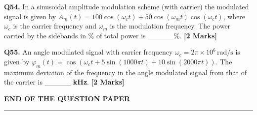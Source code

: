 \documentclass[11pt]{article}
\newcommand{\questionb}[2]{
    \noindent\textbf{Q#2.} #1 \hfill \textbf{[2 Marks]}
}
\begin{document}
\questionb{In a sinusoidal amplitude modulation scheme (with carrier) the modulated signal is given by  
\( A_m(t) = 100 \cos(\omega_c t) + 50 \cos(\omega_m t) \cos(\omega_c t) \),  
where \(\omega_c\) is the carrier frequency and \(\omega_m\) is the modulation frequency. The power carried by the sidebands in \% of total power is \_\_\_\_\_\%.}{54}
\vspace{0.5cm}

\questionb{An angle modulated signal with carrier frequency \(\omega_c = 2\pi \times 10^6 \, \text{rad/s}\) is given by  
\(\varphi_m(t) = \cos(\omega_c t + 5 \sin(1000\pi t) + 10 \sin(2000\pi t))\).  
The maximum deviation of the frequency in the angle modulated signal from that of the carrier is \_\_\_\_\_ \textbf{kHz}.}{55}
\vspace{0.5cm}

\vspace{5cm}
\begin{center}
\textbf{END OF THE QUESTION PAPER} \\
\rule{\textwidth}{0.5pt}
\end{center}
\end{document}
